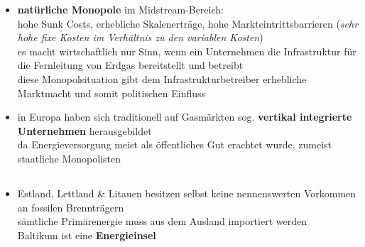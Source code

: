 \documentclass[11pt,a4paper]{article}
\begin{document}
\begin{itemize}
\item \textbf{natürliche Monopole} im Midstream-Bereich:\\
 hohe Sunk Costs, erhebliche Skalenerträge, hohe Markteintrittsbarrieren (\textsl{sehr hohe fixe Kosten im Verhältnis zu den variablen Kosten})\\
 es macht wirtschaftlich nur Sinn, wenn ein Unternehmen die Infrastruktur für die Fernleitung von Erdgas bereitstellt und betreibt\\
 diese Monopolsituation gibt dem Infrastrukturbetreiber erhebliche Marktmacht und somit politischen Einfluss


\item in Europa haben sich traditionell auf Gasmärkten sog. \textbf{vertikal integrierte Unternehmen} herausgebildet\\
 da Energieversorgung meist als öffentliches Gut erachtet wurde, zumeist staatliche Monopolisten


\end{itemize}




\subsection*{\color{MidnightBlue}{Gasmärkte in den baltischen Ländern}}

\begin{itemize}

\item Estland, Lettland \& Litauen besitzen selbst keine nennenswerten Vorkommen an fossilen Brennträgern\\
 sämtliche Primärenergie muss aus dem Ausland importiert werden\\
 Baltikum ist eine \textbf{Energieinsel}


\end{itemize}


\paragraph{\color{Orange}{Energiemarkt Lettland}} 
\end{document}
